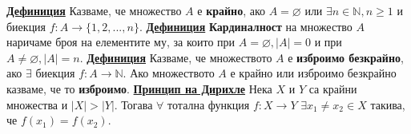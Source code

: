 \documentclass{article}
\begin{document}
\textbf{\underline{Дефиниция}}
Казваме, че множество $A$ е \textbf{крайно}, ако $A = \varnothing$ или $\exists n \in \mathbb{N}, n \ge 1$ и биекция $f : A \rightarrow \{1, 2, ..., n\}$. \newline\newline
\textbf{\underline{Дефиниция}}
\textbf{Кардиналност} на множество $A$ наричаме броя на елементите му, за които при $A = \varnothing, |A| = 0$ и при $A \neq \varnothing, |A| = n$. \newline\newline
\textbf{\underline{Дефиниция}}
Казваме, че множеството $A$ е \textbf{изброимо безкрайно}, ако $\exists \text { биекция } f : A \rightarrow \mathbb{N}$. Ако множеството $A$ е крайно или изброимо
безкрайно казваме, че то \textbf{изброимо}. \newline\newline
\textbf{\underline{Принцип на Дирихле}}
Нека $X$ и $Y$ са крайни множества и $|X| > |Y|$. Тогава $\forall$ тотална функция $f : X \rightarrow Y$ $\exists x_1 \neq x_2 \in X$ такива, че $f(x_1) = f(x_2)$.

\subsection*{\color{lightBlue}{2. Основни комбинаторни принципи и конфигурации. Рекурентни уравнения.}}
\end{document}
